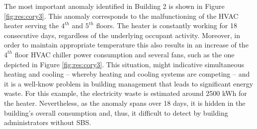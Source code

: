 The most important anomaly identified in Building 2 is shown in Figure \ref{fig:res:cory3}.
This anomaly corresponds to the malfunctioning of the HVAC heater serving the $4^{th}$ and $5^{th}$ floors. 
The heater is constantly working for 18 consecutive days, regardless of the underlying occupant activity.
Moreover, in order to maintain appropriate temperature this also results in an increase of the $4^{th}$ floor HVAC chiller power consumption 
and several fans, such as the one depicted in Figure \ref{fig:res:cory3}.
This situation, might indicative simultaneous heating and cooling -- whereby heating and cooling systems are competing -- and it 
is a well-know problem in building management that leads to significant energy waste.
For this example, the electricity waste is estimated around 2500 kWh for the heater.
Nevertheless, as the anomaly spans over 18 days, it is hidden in the building's overall consumption and, thus, it difficult to detect 
by building administrators without SBS.
